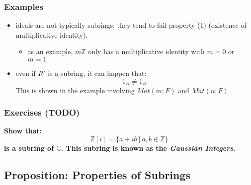 \documentclass{exam}
\begin{document}
\subsubsection{Examples}

\begin{itemize}
    \item ideals are not typically subrings: they tend to fail property (1) (existence of multiplicative identity).
    \begin{itemize}
        \item as an example, $m\mathbb{Z}$ only has a multiplicative identity with $m = 0$ or $m = 1$
    \end{itemize}
    \item even if $R'$ is a subring, it can happen that:
    \[
    1_R \neq 1_{R'}
    \]
    This is shown in the example involving $Mat(m;F)$ and $Mat(n;F)$
\end{itemize}

\subsubsection{Exercises (TODO)}

\begin{questions}

\question \textbf{Show that:
\[
\mathbb{Z}[i] = \{a + ib \ | \ a,b \in \mathbb{Z}\}
\]
is a subring of $\mathbb{C}$. This subring is known as the \textit{Gaussian Integers}.}

\end{questions}

\subsection{Proposition: Properties of Subrings}

\end{document}
